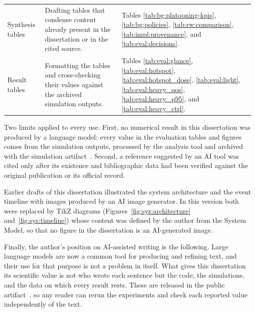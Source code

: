 \begin{table}[htb]
\begin{center}
\begin{tabularx}{\linewidth}{@{}>{\raggedright\arraybackslash}p{2.6cm} >{\raggedright\arraybackslash}X >{\raggedright\arraybackslash}p{4.4cm}@{}}
			\addlinespace
			Synthesis tables &
			  Drafting tables that condense content already present in the dissertation or in the cited source. &
			  Tables \ref{tab:bg:platooning-kpis}, \ref{tab:bg:policies}, \ref{tab:rw:comparison}, \ref{tab:impl:provenance}, and \ref{tab:eval:decisions}. \\
			\addlinespace
			Result tables &
			  Formatting the tables and cross-checking their values against the archived simulation outputs. &
			  Tables \ref{tab:eval:glance}, \ref{tab:eval:hotspot}, \ref{tab:eval:hotspot_dose}, \ref{tab:eval:light}, \ref{tab:eval:heavy_qos}, \ref{tab:eval:heavy_p95}, and \ref{tab:eval:heavy_ctrl}. \\
			\bottomrule
		\end{tabularx}
	\end{center}
\end{table}

Two limits applied to every use.
First, no numerical result in this dissertation was produced by a language model: every value in the evaluation tables and figures comes from the simulation outputs, processed by the analysis tool and archived with the simulation artifact~\cite{aguiar2026_veins_qos}.
Second, a reference suggested by an AI tool was cited only after its existence and bibliographic data had been verified against the original publication or its official record.

Earlier drafts of this dissertation illustrated the system architecture and the event timeline with images produced by an AI image generator.
In this version both were replaced by TikZ diagrams (Figures~\ref{fig:sys:architecture} and~\ref{fig:sys:timeline}) whose content was defined by the author from the System Model, so that no figure in the dissertation is an AI-generated image.

Finally, the author's position on AI-assisted writing is the following.
Large language models are now a common tool for producing and refining text, and their use for that purpose is not a problem in itself.
What gives this dissertation its scientific value is not who wrote each sentence but the code, the simulations, and the data on which every result rests.
These are released in the public artifact~\cite{aguiar2026_veins_qos}, so any reader can rerun the experiments and check each reported value independently of the text.
